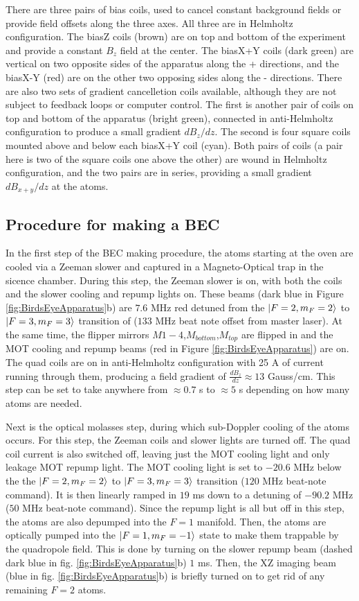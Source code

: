 There are three pairs of bias coils, used to cancel constant background fields or provide field offsets along the three axes. All three are in Helmholtz configuration. The biasZ coils (brown) are on top and bottom of the experiment and provide a constant $B_z$ field at the center. The biasX+Y coils (dark green) are vertical on two opposite sides of the apparatus along the \ex{}+\ey{} directions, and the biasX-Y (red) are on the other two opposing sides along the \ex{}-\ey{} directions. There are also two sets of gradient cancelletion coils available, although they are not subject to feedback loops or computer control. The first is another pair of coils on top and bottom of the apparatus (bright green), connected in anti-Helmholtz configuration to produce a small gradient $dB_z/dz$. The second is four square coils mounted above and below each biasX+Y coil (cyan). Both pairs of coils (a pair here is two of the square coils one above the other) are wound in Helmholtz configuration, and the two pairs are in series, providing a small gradient $dB_{x+y}/dz$ at the atoms.  


\subsection{Procedure for making a BEC}\label{sec:BECsequence}

In the first step of the BEC making procedure, the atoms starting at the oven are cooled via a Zeeman slower and captured in a Magneto-Optical trap in the sicence chamber. During this step, the Zeeman slower is on, with both the coils and the slower cooling and repump lights on. These beams (dark blue in Figure \ref{fig:BirdsEyeApparatus}b) are $7.6$ MHz red detuned from the $\mathinner{|{F=2,m_F=2}\rangle}$ to $\mathinner{|{F=3,m_F=3}\rangle}$ transition of \Rb{} ($133$ MHz beat note offset from master laser). At the same time, the flipper mirrors $M1-4$,$M_{bottom}$,$M_{top}$ are flipped in and the MOT cooling and repump beams (red in Figure \ref{fig:BirdsEyeApparatus}) are on. The quad coils are on in anti-Helmholtz configuration with 25 A of current running through them, producing a field gradient of $\frac{dB_z}{dz}\approx13$ Gauss/cm. This step can be set to take anywhere from $\approx0.7$ s to $\approx5$ s depending on how many atoms are needed.  

Next is the optical molasses step, during which sub-Doppler cooling of the atoms occurs. For this step, the Zeeman coils and slower lights are turned off. The quad coil current is also switched off, leaving just the MOT cooling light and only leakage MOT repump light. The MOT cooling light is set to $-20.6$ MHz below the the $\mathinner{|{F=2,m_F=2}\rangle}$ to $\mathinner{|{F=3,m_F=3}\rangle}$ transition ($120$ MHz beat-note command). It is then linearly ramped in $19$ ms down to a detuning of $-90.2$ MHz ($50$ MHz beat-note command). Since the repump light is all but off in this step, the atoms are also depumped into the $F=1$ manifold. Then, the atoms are optically pumped into the $\mathinner{|{F=1,m_F=-1}\rangle}$ state to make them trappable by the quadropole field. This is done by turning on the slower repump beam (dashed dark blue in fig. \ref{fig:BirdsEyeApparatus}b) $1$ ms. Then, the XZ imaging beam (blue in fig. \ref{fig:BirdsEyeApparatus}b) is briefly turned on to get rid of any remaining $F=2$ atoms. 

